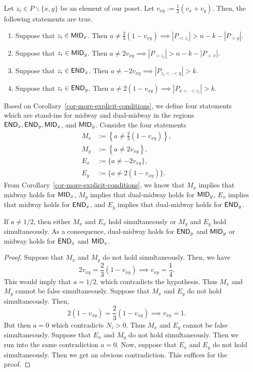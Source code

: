 \documentclass{puthesis-UG}
\begin{document}
\begin{cor} \label{cor-more-explicit-conditions}
	Let $z_i \in P \backslash \{x, y\}$ be an element of our poset. Let $v_{xy} := \frac{1}{2} (v_x + v_y)$. Then, the following statements are true. 
	\begin{enumerate}[label = (\alph*)]
		\item Suppose that $z_i \in \mathsf{MID}_x$. Then $a \neq \frac{2}{3} (1 - v_{xy}) \implies |P_{<z_i}| > n-k-|P_{>y}|$. 
		\item Suppose that $z_i \in \mathsf{MID}_y$. Then $a \neq 2v_{xy} \implies |P_{>z_i}| > n-k-|P_{< x}|$. 
		\item Suppose that $z_i \in \mathsf{END}_x$. Then $a \neq -2v_{xy} \implies |P_{z_i < \cdot < y}| > k$. 
		\item Suppose that $z_i \in \mathsf{END}_y$. Then $a \neq 2 (1 - v_{xy}) \implies |P_{x < \cdot < z_i}| > k$. 
	\end{enumerate}
\end{cor}
Based on Corollary~\ref{cor-more-explicit-conditions}, we define four statements which are stand-ins for midway and dual-midway in the regions $\mathsf{END}_x, \mathsf{END}_y, \mathsf{MID}_x$, and $\mathsf{MID}_y$. Consider the four statements 
\begin{align*}
	M_x & := \left \{ a \neq \frac{2}{3} (1 - v_{xy}) \right \}, \\
	M_y & := \left \{ a \neq 2v_{xy} \right \}, \\
	E_x & := \{ a \neq -2v_{xy} \}, \\
	E_y & := \{ a \neq 2 ( 1 - v_{xy}) \}.
\end{align*}
From Corollary~\ref{cor-more-explicit-conditions}, we know that $M_x$ implies that midway holds for $\mathsf{MID}_x$, $M_y$ implies that dual-midway holds for $\mathsf{MID}_y$, $E_x$ implies that midway holds for $\mathsf{END}_x$, and $E_y$ implies that dual-midway holds for $\mathsf{END}_y$.

\begin{lem} \label{lem-when-a-not-half-then-either-mid-or-dual-mid}
	If $a \neq 1/2$, then either $M_x$ and $E_x$ hold simultaneously or $M_y$ and $E_y$ hold simultaneously. As a consequence, dual-midway holds for $\mathsf{END}_y$ and $\mathsf{MID}_y$ or midway holds for $\mathsf{END}_x$ and $\mathsf{MID}_x$.
\end{lem}

\begin{proof}
	Suppose that $M_x$ and $M_y$ do not hold simultaneously. Then, we have 
	\[
		2v_{xy} = \frac{2}{3} (1 - v_{xy}) \implies v_{xy} = \frac{1}{4}.
	\]
	This would imply that $a = 1/2$, which contradicts the hypothesis. Thus $M_x$ and $M_y$ cannot be false simultaneously. Suppose that $M_x$ and $E_y$ do not hold simultaneously. Then, 
	\[
		2(1 -v_{xy}) = \frac{2}{3} (1 - v_{xy}) \implies v_{xy} = 1.
	\]
	But then $a = 0$ which contradicts $N_i > 0$. Thus $M_x$ and $E_y$ cannot be false simultaneously. Suppose that $E_x$ and $M_y$ do not hold simultaneously. Then we run into the same contradiction $a = 0$. Now, suppose that $E_x$ and $E_y$ do not hold simultaneously. Then we get an obvious contradiction. This suffices for the proof.  
\end{proof}
\end{document}
